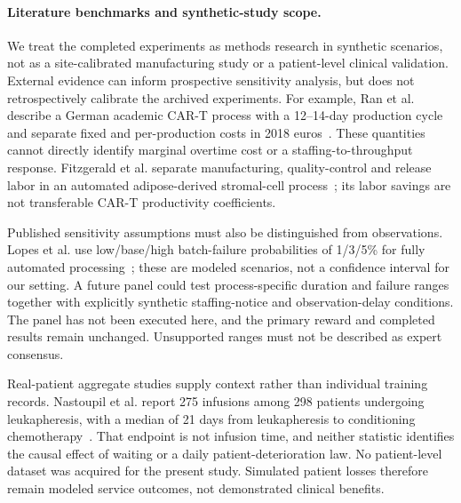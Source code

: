 \documentclass[preprint,review,12pt]{elsarticle}
\begin{document}
\paragraph{Literature benchmarks and synthetic-study scope.}
We treat the completed experiments as methods research in synthetic scenarios,
not as a site-calibrated manufacturing study or a patient-level clinical
validation. External evidence can inform prospective sensitivity analysis,
but does not retrospectively calibrate the archived experiments. For example,
Ran et al. describe a German academic CAR-T process with a 12--14-day production
cycle and separate fixed and per-production costs in 2018
euros~\cite{Ran2020DecentralizedCART}. These quantities cannot directly identify
marginal overtime cost or a staffing-to-throughput response. Fitzgerald et al.
separate manufacturing, quality-control and release labor in an automated
adipose-derived stromal-cell process~\cite{Fitzgerald2022AutomatedASC}; its
labor savings are not transferable CAR-T productivity coefficients.

Published sensitivity assumptions must also be distinguished from observations.
Lopes et al. use low/base/high batch-failure probabilities of 1/3/5\% for
fully automated processing~\cite{Lopes2020VeinToVein}; these are modeled
scenarios, not a confidence interval for our setting. A future panel could
test process-specific duration and failure ranges together with explicitly
synthetic staffing-notice and observation-delay conditions. The panel has not
been executed here, and the primary reward and completed results remain
unchanged. Unsupported ranges must not be described as expert consensus.

Real-patient aggregate studies supply context rather than individual training
records. Nastoupil et al. report 275 infusions among 298 patients undergoing
leukapheresis, with a median of 21 days from leukapheresis to conditioning
chemotherapy~\cite{Nastoupil2020StandardOfCare}. That endpoint is not infusion
time, and neither statistic identifies the causal effect of waiting or a
daily patient-deterioration law. No patient-level dataset was acquired for
the present study. Simulated patient losses therefore remain modeled service
outcomes, not demonstrated clinical benefits.
\end{document}

